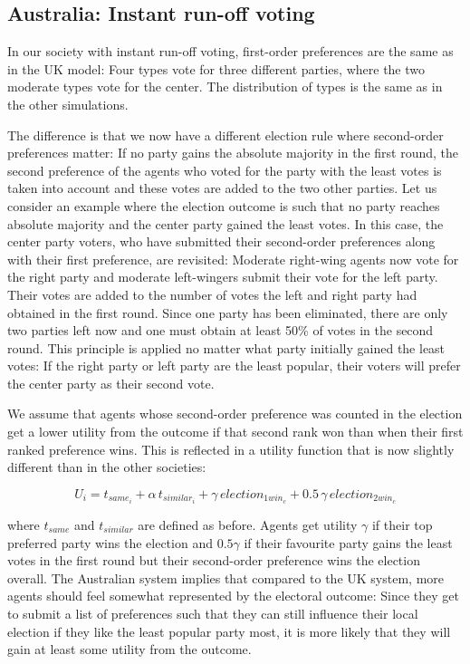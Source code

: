 \documentclass[12pt, a4paper]{article}
\begin{document}
	
	\subsection{Australia: Instant run-off voting} 
	In our society with instant run-off voting, first-order preferences are the same as in the UK model: Four types vote for three different parties, where the two moderate types vote for the center. The distribution of types is the same as in the other simulations.
	
	The difference is that we now have a different election rule where second-order preferences matter: If no party gains the absolute majority in the first round, the second preference of the agents who voted for the party with the least votes is taken into account and these votes are added to the two other parties. Let us consider an example where the election outcome is such that no party reaches absolute majority and the center party gained the least votes. In this case, the center party voters, who have submitted their second-order preferences along with their first preference, are revisited: Moderate right-wing agents now vote for the right party and moderate left-wingers submit their vote for the left party. Their votes are added to the number of votes the left and right party had obtained in the first round. Since one party has been eliminated, there are only two parties left now and one must obtain at least 50\% of votes in the second round. This principle is applied no matter what party initially gained the least votes: If the right party or left party are the least popular, their voters will prefer the center party as their second vote.
	
	We assume that agents whose second-order preference was counted in the election get a lower utility from the outcome if that second rank won than when their first ranked preference wins. This is reflected in a utility function that is now slightly different than in the other societies:
	
	\begin{equation}
	U_i=t_{same_i}+\alpha \, t_{similar_i}+\gamma \, election_{1win_c} + 0.5 \, \gamma \, election_{2win_c}
	\end{equation}
	
	where $t_{same}$ and $t_{similar}$ are defined as before. Agents get utility $\gamma$ if their top preferred party wins the election and $0.5 \gamma$ if their favourite party gains the least votes in the first round but their second-order preference wins the election overall. The Australian system implies that compared to the UK system, more agents should feel somewhat represented by the electoral outcome: Since they get to submit a list of preferences such that they can still influence their local election if they like the least popular party most, it is more likely that they will gain at least some utility from the outcome.
	
\end{document}
